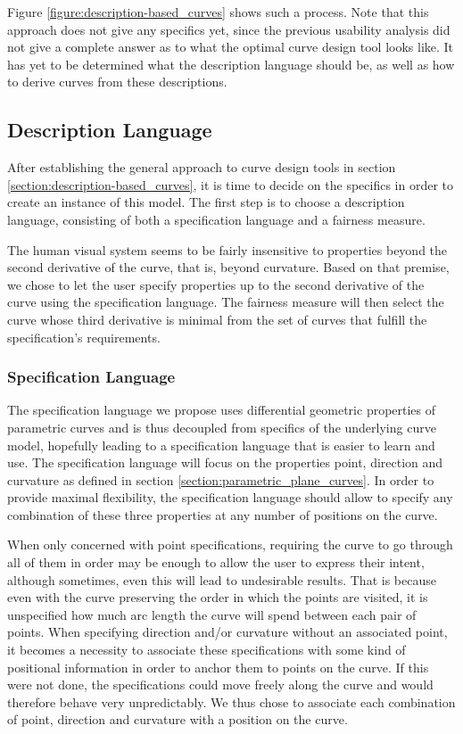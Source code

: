 \documentclass[a4paper]{article}
\begin{document}
			Figure \ref{figure:description-based_curves} shows such a process. Note that this approach does not give any specifics yet, since the previous usability analysis did not give a complete answer as to what the optimal curve design tool looks like. It has yet to be determined what the description language should be, as well as how to derive curves from these descriptions.

		\subsection{Description Language}
		\label{section:description_language}
			
			After establishing the general approach to curve design tools in section \ref{section:description-based_curves}, it is time to decide on the specifics in order to create an instance of this model. The first step is to choose a description language, consisting of both a specification language and a fairness measure.

			The human visual system seems to be fairly insensitive to properties beyond the second derivative of the curve, that is, beyond curvature. Based on that premise, we chose to let the user specify properties up to the second derivative of the curve using the specification language. The fairness measure will then select the curve whose third derivative is minimal from the set of curves that fulfill the specification's requirements.

			\subsubsection{Specification Language}
			\label{section:specification_language}

				The specification language we propose uses differential geometric properties of parametric curves and is thus decoupled from specifics of the underlying curve model, hopefully leading to a specification language that is easier to learn and use. The specification language will focus on the properties point, direction and curvature as defined in section \ref{section:parametric_plane_curves}. In order to provide maximal flexibility, the specification language should allow to specify any combination of these three properties at any number of positions on the curve.

				When only concerned with point specifications, requiring the curve to go through all of them in order may be enough to allow the user to express their intent, although sometimes, even this will lead to undesirable results. That is because even with the curve preserving the order in which the points are visited, it is unspecified how much arc length the curve will spend between each pair of points. When specifying direction and/or curvature without an associated point, it becomes a necessity to associate these specifications with some kind of positional information in order to anchor them to points on the curve. If this were not done, the specifications could move freely along the curve and would therefore behave very unpredictably. We thus chose to associate each combination of point, direction and curvature with a position on the curve.
\end{document}
